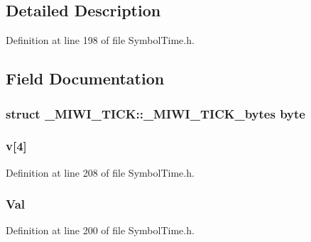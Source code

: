 \subsection{Detailed Description}


Definition at line 198 of file Symbol\+Time.\+h.



\subsection{Field Documentation}
\hypertarget{union___m_i_w_i___t_i_c_k_a9ddf7108ad882173758c40079962abfc}{}
\subsubsection[{byte}]{\setlength{\rightskip}{0pt plus 5cm}struct {\bf \+\_\+\+M\+I\+W\+I\+\_\+\+T\+I\+C\+K\+::\+\_\+\+M\+I\+W\+I\+\_\+\+T\+I\+C\+K\+\_\+bytes}  byte}\label{union___m_i_w_i___t_i_c_k_a9ddf7108ad882173758c40079962abfc}
\hypertarget{union___m_i_w_i___t_i_c_k_a6a8b1b6abca9b51faec40b33d22aed79}{}
\subsubsection[{v}]{ v\mbox{[}4\mbox{]}}\label{union___m_i_w_i___t_i_c_k_a6a8b1b6abca9b51faec40b33d22aed79}


Definition at line 208 of file Symbol\+Time.\+h.

\hypertarget{union___m_i_w_i___t_i_c_k_a1a2aefd22f32fe19c7a40fd62958b591}{}
\subsubsection[{Val}]{ Val}\label{union___m_i_w_i___t_i_c_k_a1a2aefd22f32fe19c7a40fd62958b591}


Definition at line 200 of file Symbol\+Time.\+h.

